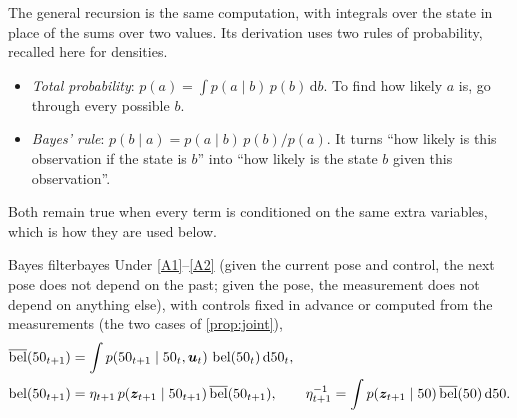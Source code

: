 The general recursion is the same computation, with integrals over the
state in place of the sums over two values. Its derivation uses two rules
of probability, recalled here for densities.
\begin{itemize}[nosep]
  \item \emph{Total probability}: $p(a)=\int p(a\mid b)\,p(b)\,\mathrm db$.
    To find how likely $a$ is, go through every possible $b$.
  \item \emph{Bayes' rule}: $p(b\mid a)=p(a\mid b)\,p(b)/p(a)$. It turns
    ``how likely is this observation if the state is $b$'' into ``how
    likely is the state $b$ given this observation''.
\end{itemize}
Both remain true when every term is conditioned on the same extra
variables, which is how they are used below.

\begin{theorem}{Bayes filter}{bayes}
Under \ref{A1}--\ref{A2} (given the current pose and control, the next
pose does not depend on the past; given the pose, the measurement does
not depend on anything else), with controls fixed in advance or computed
from the measurements (the two cases of \cref{prop:joint}),
\begin{align}
  \overline{\operatorname{bel}}(50_{t+1})&=\int p(50_{t+1}\mid50_t,\bm{u}_t)\,\operatorname{bel}(50_t)\,
  \mathrm d50_t, \label{eq:predict}\\
  \operatorname{bel}(50_{t+1})&=\eta_{t+1}\,p(\bm{z}_{t+1}\mid50_{t+1})\,
  \overline{\operatorname{bel}}(50_{t+1}),\qquad
  \eta_{t+1}^{-1}=\int p(\bm{z}_{t+1}\mid50)\,\overline{\operatorname{bel}}(50)\,\mathrm d50.
  \label{eq:update}
\end{align}
\end{theorem}


